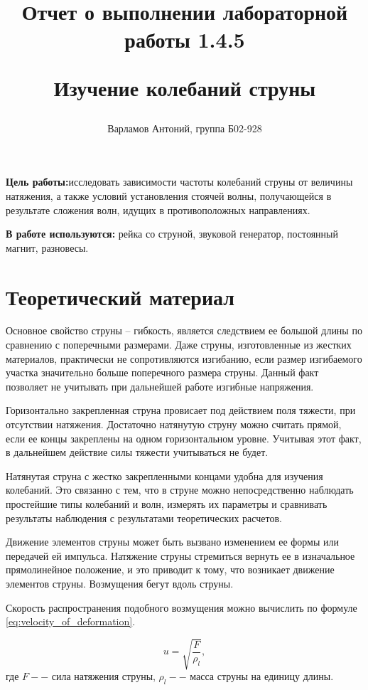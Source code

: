 \documentclass[12pt,a4paper]{article}
\title{
Отчет о выполнении лабораторной работы 1.4.5

Изучение колебаний струны
}
\author{Варламов Антоний, группа Б02-928}
\begin{document}
\maketitle
\newpage

\textbf{Цель работы:}исследовать зависимости частоты колебаний струны от величины натяжения, а также условий установления стоячей волны, получающейся в результате сложения волн, идущих в противоположных направлениях.

\textbf{В работе используются:} рейка со струной, звуковой генератор, постоянный магнит, разновесы.

\section{Теоретический материал}
Основное свойство струны -- гибкость, является следствием ее большой длины по сравнению с поперечными размерами. Даже струны, изготовленные из жестких материалов, практически не сопротивляются изгибанию, если размер изгибаемого участка значительно больше поперечного размера струны. Данный факт позволяет не учитывать при дальнейшей работе изгибные напряжения.

Горизонтально закрепленная струна провисает под действием поля тяжести, при отсутствии натяжения. Достаточно натянутую струну можно считать прямой, если ее концы закреплены на одном горизонтальном уровне. Учитывая этот факт, в дальнейшем действие силы тяжести учитываться не будет.

Натянутая струна с жестко закрепленными концами удобна для изучения колебаний. Это связанно с тем, что в струне можно непосредственно наблюдать простейшие типы колебаний и волн, измерять их параметры и сравнивать результаты наблюдения с результатами теоретических расчетов.

Движение элементов струны может быть вызвано изменением ее формы или передачей ей импульса. Натяжение струны стремиться вернуть ее в изначальное прямолинейное положение, и это приводит к тому, что возникает движение элементов струны. Возмущения бегут вдоль струны.

Скорость распространения подобного возмущения можно вычислить по формуле \ref{eq:velocity_of_deformation}.

\begin{equation}
	u = \sqrt{\frac{F}{\rho_{l}}},
	\label{eq:velocity_of_deformation}
\end{equation}
где $F -- $ сила натяжения струны, $\rho_{l} -- $ масса струны на единицу длины.
\end{document}
